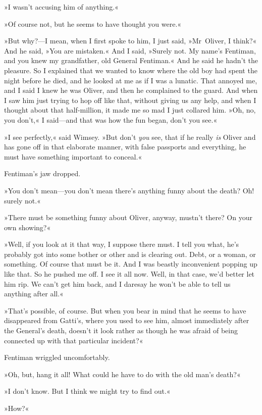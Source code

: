 »I wasn't accusing him of anything.«

»Of course not, but he seems to have thought you were.«

»But why?—I mean, when I first spoke to him, I just said, »Mr~Oliver, I think?« And he said, »You are mistaken.« And I said, »Surely not. My name's Fentiman, and you knew my grandfather, old General Fentiman.« And he said he hadn't the pleasure. So I explained that we wanted to know where the old boy had spent the night before he died, and he looked at me as if I was a lunatic. That annoyed me, and I said I knew he was Oliver, and then he complained to the guard. And when I saw him just trying to hop off like that, without giving us any help, and when I thought about that half-million, it made me so mad I just collared him. »Oh, no, you don't,« I said—and that was how the fun began, don't you see.«

»I see perfectly,« said Wimsey. »But don't \textit{you} see, that if he really \textit{is} Oliver and has gone off in that elaborate manner, with false passports and everything, he must have something important to conceal.«

Fentiman's jaw dropped.

»You don't mean—you don't mean there's anything funny about the death? Oh! surely not.«

»There must be something funny about Oliver, anyway, mustn't there? On your own showing?«

»Well, if you look at it that way, I suppose there must. I tell you what, he's probably got into some bother or other and is clearing out. Debt, or a woman, or something. Of course that must be it. And I was beastly inconvenient popping up like that. So he pushed me off. I see it all now. Well, in that case, we'd better let him rip. We can't get him back, and I daresay he won't be able to tell us anything after all.«

»That's possible, of course. But when you bear in mind that he seems to have disappeared from Gatti's, where you used to see him, almost immediately after the General's death, doesn't it look rather as though he was afraid of being connected up with that particular incident?«

Fentiman wriggled uncomfortably.

»Oh, but, hang it all! What could he have to do with the old man's death?«

»I don't know. But I think we might try to find out.«

»How?«

